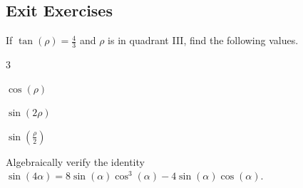 \newpage

\subsection*{Exit Exercises} \label{exit-exercises-section-double-angle-identities}


\begin{myExit}
	If $\tan(\rho)=\frac{4}{3}$ and $\rho$ is in quadrant III, find the following values.
		\begin{enumerate}
		\end{enumerate}
\end{myExit}
\vfill

\begin{myExit}
	Algebraically verify the identity $\sin(4\alpha)=8\sin(\alpha)\cos^3(\alpha)-4\sin(\alpha)\cos(\alpha)$.
\end{myExit}
\vfill
{}